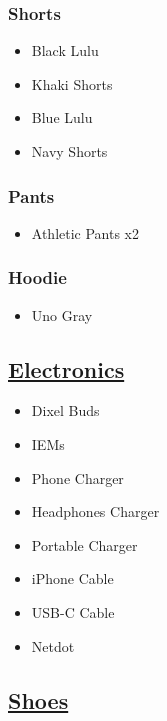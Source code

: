 \documentclass[11pt]{article}
\begin{document}
\subsubsection*{Shorts}
\label{sec:org1058539}
\begin{itemize}
\item[{$\square$}] Black Lulu
\item[{$\square$}] Khaki Shorts
\item[{$\square$}] Blue Lulu
\item[{$\square$}] Navy Shorts
\end{itemize}
\subsubsection*{Pants}
\label{sec:org5f33f2f}
\begin{itemize}
\item[{$\square$}] Athletic Pants x2
\end{itemize}
\subsubsection*{Hoodie}
\label{sec:org7545820}
\begin{itemize}
\item[{$\square$}] Uno Gray
\end{itemize}
\subsection*{\underline{Electronics}}
\label{sec:org38b3988}
\begin{itemize}
\item[{$\square$}] Dixel Buds
\item[{$\square$}] IEMs
\item[{$\square$}] Phone Charger
\item[{$\square$}] Headphones Charger
\item[{$\square$}] Portable Charger
\item[{$\square$}] iPhone Cable
\item[{$\square$}] USB-C Cable
\item[{$\square$}] Netdot
\end{itemize}
\subsection*{\underline{Shoes}}
\label{sec:org0982504}
\end{document}
